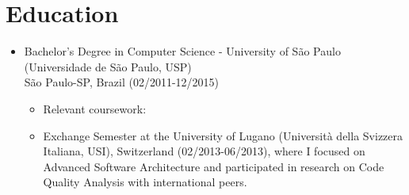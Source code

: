 
\section{Education}
\begin{itemize}
    \item \small{Bachelor's Degree in Computer Science - University of São Paulo (Universidade de São Paulo, USP)}\\
    \footnotesize{São Paulo-SP, Brazil (02/2011-12/2015)}
    \begin{itemize}[itemsep=1pt, parsep=0pt]
        \item \footnotesize{Relevant coursework: \RelevantCoursework}
        \item \footnotesize{Exchange Semester at the University of Lugano (Università della Svizzera Italiana, USI), Switzerland
            (02/2013-06/2013), where I focused on Advanced Software Architecture and participated in 
            research on Code Quality Analysis with international peers.}
    \end{itemize}
\end{itemize}